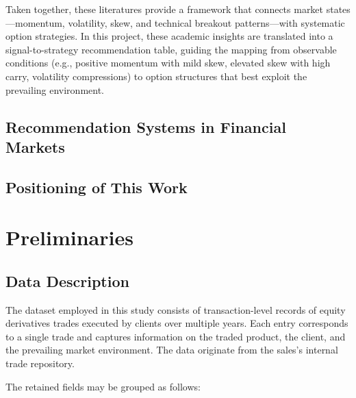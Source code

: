 \documentclass[12pt,a4paper]{report}
\begin{document}
Taken together, these literatures provide a framework that connects market states—momentum, volatility, skew, and technical breakout patterns—with systematic option strategies. In this project, these academic insights are translated into a signal-to-strategy recommendation table, guiding the mapping from observable conditions (e.g., positive momentum with mild skew, elevated skew with high carry, volatility compressions) to option structures that best exploit the prevailing environment.

\section{Recommendation Systems in Financial Markets}
\section{Positioning of This Work}

\chapter{Preliminaries}\label{chap:preliminaries}


\section{Data Description}

The dataset employed in this study consists of transaction-level records of equity derivatives trades executed by clients over multiple years. Each entry corresponds to a single trade and captures information on the traded product, the client, and the prevailing market environment. The data originate from the sales’s internal trade repository.

The retained fields may be grouped as follows:
\end{document}
